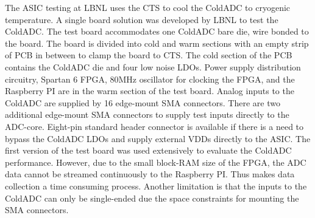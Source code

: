 \label{sec:2.4}
The ASIC testing at LBNL uses the CTS to cool the ColdADC to cryogenic temperature. A single board solution was 
developed by LBNL to test the ColdADC. The test board accommodates one ColdADC bare die, wire bonded to the board. 
The board is divided into cold and warm sections with an empty strip of PCB in between to clamp the board to CTS.
The cold section of the PCB contains the ColdADC die and four low noise LDOs.
Power supply distribution circuitry, Spartan 6 FPGA,  80MHz oscillator for clocking 
the FPGA, and the Raspberry PI are in the warm section of the test board. Analog inputs to 
the ColdADC are supplied by 16 edge-mount SMA connectors. There are two additional edge-mount SMA connectors 
to supply test inputs directly to the ADC-core. Eight-pin standard header connector is available if there is 
a need to bypass the ColdADC LDOs and supply external VDDs directly to the ASIC.
The first version of the test board was used extensively to evaluate the ColdADC performance.  However, due to the small 
block-RAM size of the FPGA, the ADC data cannot be streamed continuously to the Raspberry PI. Thus makes
data collection a time consuming process. Another limitation is that the inputs to the ColdADC can only be single-ended due 
the space constraints for mounting the SMA connectors.

